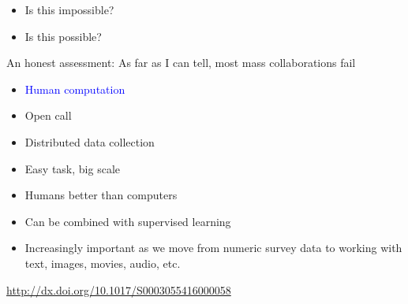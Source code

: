 \documentclass[aspectratio=169]{beamer}
\begin{document}
\begin{frame}

\begin{itemize}
\item Is this impossible?
\pause
\item Is this possible?
\end{itemize}

\end{frame}
\begin{frame}

An honest assessment: \pause As far as I can tell, most mass collaborations fail

\end{frame}
\begin{frame}

\begin{itemize}
\item \textcolor{blue}{Human computation}
\item Open call
\item Distributed data collection
\end{itemize}

\end{frame}
\begin{frame}

\begin{itemize}
\item Easy task, big scale
\pause
\item Humans better than computers
\pause
\item Can be combined with supervised learning 
\pause
\item Increasingly important as we move from numeric survey data to working with text, images, movies, audio, etc.
\end{itemize}

\end{frame}
\begin{frame}

\begin{center}
\end{center}

\vfill
{\tiny \url{http://dx.doi.org/10.1017/S0003055416000058}}

\end{frame}
\end{document}
